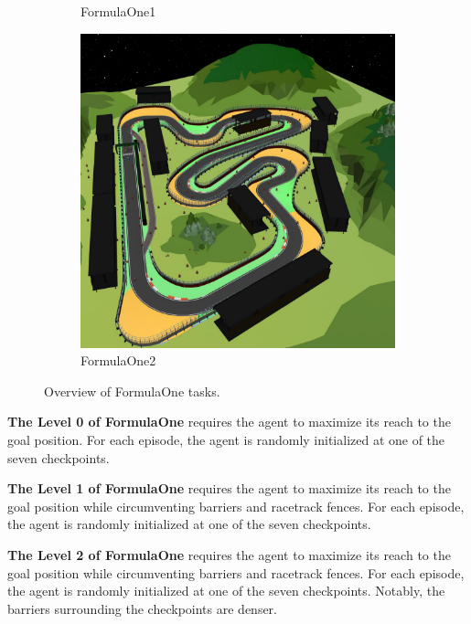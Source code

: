 \documentclass{article}
\begin{document}
\begin{figure}[H]
\begin{subfigure}{0.3\linewidth}
        \caption{FormulaOne1}
      \end{subfigure}
      \begin{subfigure}{0.3\linewidth}
        \centering
        \includegraphics[width=\linewidth]{assets/appendix/formula_one2.pdf}
        \caption{FormulaOne2}
      \end{subfigure}
      \caption{Overview of FormulaOne tasks.}
\end{figure}

\textbf{The Level 0 of FormulaOne} requires the agent to maximize its reach to the goal position. For each episode, the agent is randomly initialized at one of the seven checkpoints.

\textbf{The Level 1 of FormulaOne} requires the agent to maximize its reach to the goal position while circumventing barriers and racetrack fences. For each episode, the agent is randomly initialized at one of the seven checkpoints.

\textbf{The Level 2 of FormulaOne} requires the agent to maximize its reach to the goal position while circumventing barriers and racetrack fences. For each episode, the agent is randomly initialized at one of the seven checkpoints. Notably, the barriers surrounding the checkpoints are denser.
\end{document}
